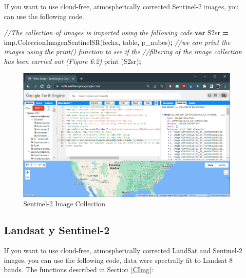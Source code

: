 \documentclass[
]{book}
\newenvironment{Shaded}{\begin{snugshade}}{\end{snugshade}}
\newcommand{\CommentTok}[1]{\textcolor[rgb]{0.56,0.35,0.01}{\textit{#1}}}
\newcommand{\FunctionTok}[1]{\textcolor[rgb]{0.00,0.00,0.00}{#1}}
\newcommand{\KeywordTok}[1]{\textcolor[rgb]{0.13,0.29,0.53}{\textbf{#1}}}
\newcommand{\NormalTok}[1]{#1}
\newcommand{\OperatorTok}[1]{\textcolor[rgb]{0.81,0.36,0.00}{\textbf{#1}}}
\begin{document}
If you want to use cloud-free, atmospherically corrected Sentinel-2 images, you can use the following code.

\begin{Shaded}
\begin{Highlighting}[]
\CommentTok{//The collection of images is imported using the following code}
\KeywordTok{var}\NormalTok{ S2sr }\OperatorTok{=}\NormalTok{ imp}\OperatorTok{.}\FunctionTok{ColeccionImagenSentinelSR}\NormalTok{(fecha}\OperatorTok{,}\NormalTok{ table}\OperatorTok{,}\NormalTok{ p\_nubes)}\OperatorTok{;}
\CommentTok{//we can print the images using the print() function to see if the }
\CommentTok{//filtering of the image collection has been carried out (Figure 6.2)}
\FunctionTok{print}\NormalTok{ (S2sr)}\OperatorTok{;}
\end{Highlighting}
\end{Shaded}

\begin{figure}

{\centering \includegraphics[width=0.85\linewidth]{./images/Figure71} 

}

\caption{Sentinel-2 Image Collection}\label{fig:figV2}
\end{figure}

\hypertarget{LanSen}{%
\subsection{Landsat y Sentinel-2}\label{LanSen}}

If you want to use cloud-free, atmospherically corrected LandSat and Sentinel-2 images, you can use the following code, data were spectrally fit to Landsat 8 bands. The functions described in Section \ref{CImg}:
\end{document}

